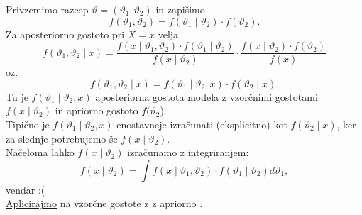 \documentclass[a4paper, 12pt]{book}
\theoremstyle{definition}
\theoremstyle{remark}
\begin{document}
Privzemimo razcep $\vartheta = (\vartheta_1, \vartheta_2)$ in zapišimo
\begin{equation*}
  f(\vartheta_1, \vartheta_2) = f(\vartheta_1 \mid \vartheta_2) \cdot f(\vartheta_2).
\end{equation*}
Za aposteriorno gostoto pri $X = x$ velja
\begin{equation*}
  f(\vartheta_1, \vartheta_2 \mid x) = \frac{f(x \mid \vartheta_1, \vartheta_2) \cdot f(\vartheta_1 \mid \vartheta_2)}{f(x \mid \vartheta_2)}
    \cdot \frac{f(x \mid \vartheta_2) \cdot f(\vartheta_2)}{f(x)}
\end{equation*}
oz.
\begin{equation*}
  f(\vartheta_1, \vartheta_2 \mid x) = f(\vartheta_1 \mid \vartheta_2, x) \cdot f(\vartheta_2 \mid x).
\end{equation*}
Tu je $f(\vartheta_1 \mid \vartheta_2, x)$ aposteriorna gostota modela z vzorčnimi gostotami $f(x \mid \vartheta_2)$
in apriorno gostoto $f(\vartheta_2$). \\
Tipično je $f(\vartheta_1 \mid \vartheta_2, x)$ enostavneje izračunati (eksplicitno) kot $f(\vartheta_2 \mid x)$,
ker za slednje potrebujemo še $f(x \mid \vartheta_2)$. \\
Načeloma lahko $f(x \mid \vartheta_2)$ izračunamo z integriranjem:
\begin{equation*}
  f(x \mid \vartheta_2) = \int f(x \mid \vartheta_1, \vartheta_2) \cdot f(\vartheta_1 \mid \vartheta_2) d\vartheta_1,
\end{equation*}
vendar :( \\
\underline{Aplicirajmo} na vzorčne gostote z  z apriorno .
\end{document}
